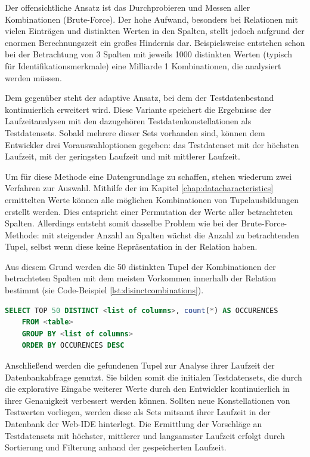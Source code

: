 Der offensichtliche Ansatz ist das Durchprobieren und Messen aller Kombinationen (Brute-Force).
Der hohe Aufwand, besonders bei Relationen mit vielen Einträgen und distinkten Werten in den Spalten, stellt jedoch aufgrund der enormen Berechnungszeit ein großes Hindernis dar.
Beispielsweise entstehen schon bei der Betrachtung von 3 Spalten mit jeweils 1000 distinkten Werten (typisch für Identifikationsmerkmale) eine Milliarde 1 Kombinationen, die analysiert werden müssen.

Dem gegenüber steht der adaptive Ansatz, bei dem der Testdatenbestand kontinuierlich erweitert wird.
Diese Variante speichert die Ergebnisse der Laufzeitanalysen mit den dazugehören Testdatenkonstellationen als Testdatensets.
Sobald mehrere dieser Sets vorhanden sind, können dem Entwickler drei Vorauswahloptionen gegeben: das Testdatenset mit der höchsten Laufzeit, mit der geringsten Laufzeit und mit mittlerer Laufzeit.

Um für diese Methode eine Datengrundlage zu schaffen, stehen wiederum zwei Verfahren zur Auswahl.
Mithilfe der im Kapitel \ref{chap:datacharacteristics} ermittelten Werte können alle möglichen Kombinationen von Tupelausbildungen erstellt werden.
Dies entspricht einer Permutation der Werte aller betrachteten Spalten.
Allerdings entsteht somit dasselbe Problem wie bei der Brute-Force-Methode: mit steigender Anzahl an Spalten wächst die Anzahl zu betrachtenden Tupel, selbst wenn diese keine Repräsentation in der Relation haben.

Aus diesem Grund werden die 50 distinkten Tupel der Kombinationen der betrachteten Spalten mit dem meisten Vorkommen innerhalb der Relation bestimmt (sie Code-Beispiel \ref{lst:disinctcombinations}).

\begin{lstlisting}[caption={Systemtabellen von SAP HANA liefern Metainformationen zu Relationen}, label={lst:disinctcombinations}, language=SQL]
	SELECT TOP 50 DISTINCT <list of columns>, count(*) AS OCCURENCES
	FROM <table>
	GROUP BY <list of columns>
	ORDER BY OCCURENCES DESC
\end{lstlisting}

Anschließend werden die gefundenen Tupel zur Analyse ihrer Laufzeit der Datenbankabfrage genutzt.
Sie bilden somit die initialen Testdatensets, die durch die explorative Eingabe weiterer Werte durch den Entwickler kontinuierlich in ihrer Genauigkeit verbessert werden können.
Sollten neue Konstellationen von Testwerten vorliegen, werden diese als Sets mitsamt ihrer Laufzeit in der Datenbank der Web-IDE hinterlegt.
Die Ermittlung der Vorschläge an Testdatensets mit höchster, mittlerer und langsamster Laufzeit erfolgt durch Sortierung und Filterung anhand der gespeicherten Laufzeit.

